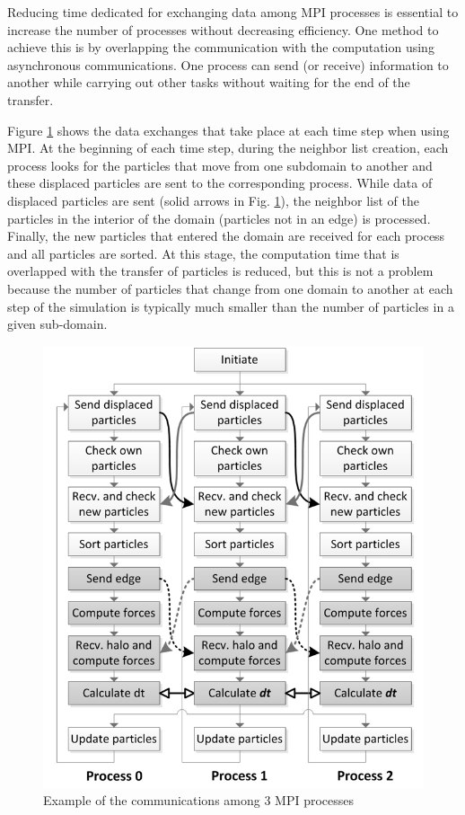 Reducing time dedicated for exchanging data among \ac{MPI} processes is essential to increase the number of processes without decreasing efficiency. One method to achieve this is by overlapping the communication with the computation using asynchronous communications. One process can send (or receive) information to another while carrying out other tasks without waiting for the end of the transfer.

Figure \ref{fig:multi_gpu} shows the data exchanges that take place at each time step when using \ac{MPI}. At the beginning of each time step, during the neighbor list creation, each process looks for the particles that move from one subdomain to another and these displaced particles are sent to the corresponding process. While data of displaced particles are sent (solid arrows in Fig. \ref{fig:multi_gpu}), the neighbor list of the particles in the interior of the domain (particles not in an edge) is processed. Finally, the new particles that entered the domain are received for each process and all particles are sorted. At this stage, the computation time that is overlapped with the transfer of particles is reduced, but this is not a problem because the number of particles that change from one domain to another at each step of the simulation is typically much smaller than the number of particles in a given sub-domain.
%

\begin{figure}[ht!]
	\centering
	\includegraphics[scale=0.45]{Figures/4.Chapter/multi_gpu_1.png}
	\caption{\small{Example of the communications among 3 MPI processes \citep{Dominguez-2013b}}}
	\label{fig:multi_gpu} 
\end{figure}

